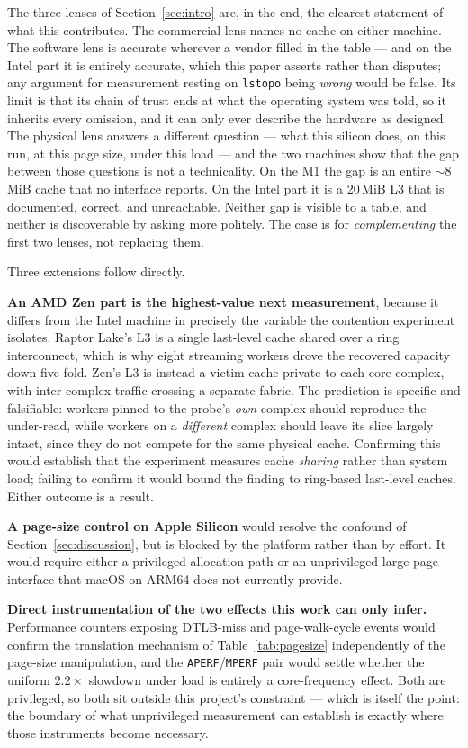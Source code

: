 \documentclass[conference]{IEEEtran}
\begin{document}
The three lenses of Section~\ref{sec:intro} are, in the end, the clearest
statement of what this contributes. The commercial lens names no cache on either
machine. The software lens is accurate wherever a vendor filled in the table ---
and on the Intel part it is entirely accurate, which this paper asserts rather
than disputes; any argument for measurement resting on \texttt{lstopo} being
\emph{wrong} would be false. Its limit is that its chain of trust ends at what the
operating system was told, so it inherits every omission, and it can only ever
describe the hardware as designed. The physical lens answers a different question
--- what this silicon does, on this run, at this page size, under this load ---
and the two machines show that the gap between those questions is not a
technicality. On the M1 the gap is an entire ${\sim}8$\,MiB cache that no
interface reports. On the Intel part it is a 20\,MiB L3 that is documented,
correct, and unreachable. Neither gap is visible to a table, and neither is
discoverable by asking more politely. The case is for \emph{complementing} the
first two lenses, not replacing them.

Three extensions follow directly.

\textbf{An AMD Zen part is the highest-value next measurement}, because it
differs from the Intel machine in precisely the variable the contention
experiment isolates. Raptor Lake's L3 is a single last-level cache shared over a
ring interconnect, which is why eight streaming workers drove the recovered
capacity down five-fold. Zen's L3 is instead a victim cache private to each core
complex, with inter-complex traffic crossing a separate fabric. The prediction is
specific and falsifiable: workers pinned to the probe's \emph{own} complex should
reproduce the under-read, while workers on a \emph{different} complex should leave
its slice largely intact, since they do not compete for the same physical cache.
Confirming this would establish that the experiment measures cache \emph{sharing}
rather than system load; failing to confirm it would bound the finding to
ring-based last-level caches. Either outcome is a result.

\textbf{A page-size control on Apple Silicon} would resolve the confound of
Section~\ref{sec:discussion}, but is blocked by the platform rather than by
effort. It would require either a privileged allocation path or an unprivileged
large-page interface that macOS on ARM64 does not currently provide.

\textbf{Direct instrumentation of the two effects this work can only infer.}
Performance counters exposing DTLB-miss and page-walk-cycle events would confirm
the translation mechanism of Table~\ref{tab:pagesize} independently of the
page-size manipulation, and the \texttt{APERF}/\texttt{MPERF} pair would settle
whether the uniform $2.2\times$ slowdown under load is entirely a core-frequency
effect. Both are privileged, so both sit outside this project's constraint ---
which is itself the point: the boundary of what unprivileged measurement can
establish is exactly where those instruments become necessary.
\end{document}
